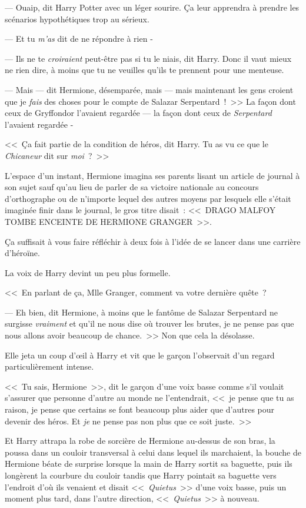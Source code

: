--- Ouaip, dit Harry Potter avec un léger sourire. Ça leur apprendra à prendre les scénarios hypothétiques trop au sérieux.

--- Et tu \emph{m'as} dit de ne répondre à rien -

--- Ils ne te \emph{croiraient} peut-être pas si tu le niais, dit Harry. Donc il vaut mieux ne rien dire, à moins que tu ne veuilles qu'ils te prennent pour une menteuse.

--- Mais — dit Hermione, désemparée, mais — mais maintenant les gens croient que je \emph{fais} des choses pour le compte de Salazar Serpentard~!~>> La façon dont ceux de Gryffondor l'avaient regardée — la façon dont ceux de \emph{Serpentard} l'avaient regardée -

<<~Ça fait partie de la condition de héros, dit Harry. Tu as vu ce que le \emph{Chicaneur} dit sur \emph{moi}~?~>>

L'espace d'un instant, Hermione imagina ses parents lisant un article de journal à son sujet sauf qu'au lieu de parler de sa victoire nationale au concours d'orthographe ou de n'importe lequel des autres moyens par lesquels elle s'était imaginée finir dans le journal, le gros titre disait~: <<~DRAGO MALFOY TOMBE ENCEINTE DE HERMIONE GRANGER~>>.

Ça suffisait à vous faire réfléchir à deux fois à l'idée de se lancer dans une carrière d'héroïne.

La voix de Harry devint un peu plus formelle.

<<~En parlant de ça, Mlle Granger, comment va votre dernière quête~?

--- Eh bien, dit Hermione, à moins que le fantôme de Salazar Serpentard ne surgisse \emph{vraiment} et qu'il ne nous dise où trouver les brutes, je ne pense pas que nous allons avoir beaucoup de chance.~>> Non que cela la désolasse.

Elle jeta un coup d'œil à Harry et vit que le garçon l'observait d'un regard particulièrement intense.

<<~Tu sais, Hermione~>>, dit le garçon d'une voix basse comme s'il voulait s'assurer que personne d'autre au monde ne l'entendrait, <<~je pense que tu as raison, je pense que certains se font beaucoup plus aider que d'autres pour devenir des héros. Et \emph{je} ne pense pas non plus que ce soit juste.~>>

Et Harry attrapa la robe de sorcière de Hermione au-dessus de son bras, la poussa dans un couloir transversal à celui dans lequel ils marchaient, la bouche de Hermione béate de surprise lorsque la main de Harry sortit sa baguette, puis ils longèrent la courbure du couloir tandis que Harry pointait sa baguette vers l'endroit d'où ils venaient et disait <<~\emph{Quietus}~>> d'une voix basse, puis un moment plus tard, dans l'autre direction, <<~\emph{Quietus}~>> à nouveau.

